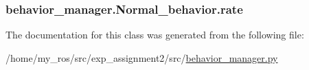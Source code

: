 \subsubsection[{\texorpdfstring{rate}{rate}}]{\setlength{\rightskip}{0pt plus 5cm}behavior\+\_\+manager.\+Normal\+\_\+behavior.\+rate}\hypertarget{classbehavior__manager_1_1Normal__behavior_a8c0881c34370caec4f5298f0ebe35489}{}\label{classbehavior__manager_1_1Normal__behavior_a8c0881c34370caec4f5298f0ebe35489}


The documentation for this class was generated from the following file\+:\begin{DoxyCompactItemize}
\item 
/home/my\+\_\+ros/src/exp\+\_\+assignment2/src/\hyperlink{behavior__manager_8py}{behavior\+\_\+manager.\+py}\end{DoxyCompactItemize}
